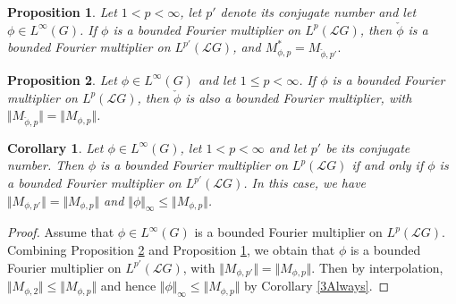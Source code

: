 \documentclass[10pt,a4paper]{amsart}
\newtheorem{corollary}{Corollary}
\newtheorem{proposition}{Proposition}
\newcommand{\norm}[1]{\Vert#1\Vert}
\begin{document}
\begin{proposition}\label{3Duality} 
Let $1<p<\infty$, let $p'$ denote its conjugate number and let $\phi\in L^\infty(G)$. If $\phi$
is a bounded Fourier multiplier on $L^p({\mathcal L}G)$, 
then $\check{\phi}$ is a bounded Fourier multiplier on $L^{p'}({\mathcal L}G)$,
and 
$
M_{\phi,p}^*= M_{\check{\phi},p'}.
$
\end{proposition}

\begin{proposition}\label{4Antipode}
Let $\phi\in L^\infty(G)$ and let $1\leq p<\infty$. If $\phi$ is a bounded Fourier multiplier on
$L^p({\mathcal L}G)$, then $\check{\phi}$ is also a bounded Fourier multiplier, with
$\norm{M_{\check{\phi},p}}= \norm{M_{\phi,p}}$.
\end{proposition}

\begin{corollary}\label{5SelfDual}
Let $\phi\in L^\infty(G)$, let $1< p<\infty$ and let $p'$ be its conjugate number. 
Then $\phi$ is a bounded Fourier multiplier on
$L^p({\mathcal L}G)$ if and only if $\phi$ is a bounded Fourier multiplier on
$L^{p'}({\mathcal L}G)$. In this case, we
have $\norm{M_{\phi,p'}}=\norm{M_{\phi,p}}$ and $\norm{\phi}_\infty\leq \norm{M_{\phi,p}}$.
\end{corollary}

\begin{proof}
Assume that $\phi\in L^\infty(G)$
is a bounded Fourier multiplier on
$L^p({\mathcal L}G)$.
Combining Proposition \ref{4Antipode} and Proposition \ref{3Duality}, we obtain
that $\phi$ is a bounded Fourier multiplier on
$L^{p'}({\mathcal L}G)$, with $\norm{M_{\phi,p'}}=\norm{M_{\phi,p}}$. 
Then by interpolation,
$\norm{M_{\phi,2}}\leq \norm{M_{\phi,p}}$ and hence 
$\norm{\phi}_\infty\leq \norm{M_{\phi,p}}$
by Corollary \ref{3Always}.
\end{proof}
\end{document}
